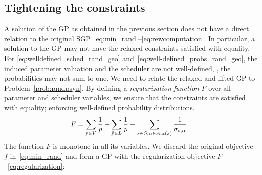 \subsection{Tightening the constraints}
A solution of the GP as obtained in the previous section does not have a direct relation to the original SGP~\eqref{eq:min_rand}--\eqref{eq:rewcomputation}.
In particular, a solution to the GP may not have the relaxed constraints satisfied with equality. 
For \eqref{eq:welldefined_sched_rand_geo} and~\eqref{eq:well-defined_probs_rand_geo}, the induced parameter valuation and the scheduler are not well-defined, \ie, the probabilities may not sum to one. 
We need to relate the relaxed and lifted GP to Problem~\ref{prob:pmdpsyn}. By defining a \emph{regularization function} $F$ over all parameter and scheduler variables, we ensure that the constraints are satisfied with equality; enforcing well-defined probability distributions.
%
\begin{align}
	F = \sum_{p\in {V}} \frac{1}{p} + \sum_{\bar p\in L} \frac{1}{\bar p} + \sum_{s\in S,\alpha\in\mathit{Act}(s)} \frac{1}{\sigma_{s,\alpha}}\label{eq:regularization} \ .
\end{align}
The function $F$ is monotone in all its variables. We discard the original objective $f$ in~\eqref{eq:min_rand} and form a GP with the regularization objective $F$~\eqref{eq:regularization}:
